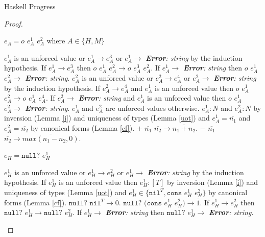 \begin{theorem}{Haskell Progress}
\begin{proof}
\begin{case}
\end{case}


\begin{case}

$e_{A}=o$ $e_{A}^{1}$ $e_{A}^{2}$ where $A\in\lbrace H,M\rbrace$

$e_{A}^{1}$ is an unforced value or $e_{A}^{1}\rightarrow e_{A}^{3}$ or $e_{A}^{1}\rightarrow$ \emph{\textbf{Error}: string} by the induction hypothesis.  If $e_{A}^{1}\rightarrow e_{A}^{3}$ then $o$ $e_{A}^{1}$ $e_{A}^{2}\rightarrow o$ $e_{A}^{3}$ $e_{A}^{2}$.  If $e_{A}^{1}\rightarrow$ \emph{\textbf{Error}: string} then $o$ $e_{A}^{1}$ $e_{A}^{2}\rightarrow$ \emph{\textbf{Error}: string}.  $e_{A}^{2}$ is an unforced value or $e_{A}^{2}\rightarrow e_{A}^{4}$ or $e_{A}^{2}\rightarrow$ \emph{\textbf{Error}: string} by the induction hypothesis.  If $e_{A}^{2}\rightarrow e_{A}^{4}$ and $e_{A}^{1}$ is an unforced value then $o$ $e_{A}^{1}$ $e_{A}^{2}\rightarrow o$ $e_{A}^{1}$ $e_{A}^{4}$.  If $e_{A}^{2}\rightarrow$ \emph{\textbf{Error}: string} and $e_{A}^{1}$ is an unforced value then $o$ $e_{A}^{1}$ $e_{A}^{2}\rightarrow$ \emph{\textbf{Error}: string}.  $e_{A}^{1}$ and $e_{A}^{2}$ are unforced values otherwise.  $e_{A}^{1}:N$ and $e_{A}^{2}:N$ by inversion (Lemma \ref{i}) and uniqueness of types (Lemma \ref{uot}) and $e_{A}^{1}=\overline{n_{1}}$ and $e_{A}^{2}=\overline{n_{2}}$ by canonical forms (Lemma \ref{cf}).  $+$ $\overline{n_{1}}$ $\overline{n_{2}}\rightarrow\overline{n_{1}+n_{2}}$.  $-$ $\overline{n_{1}}$ $\overline{n_{2}}\rightarrow\overline{max(n_{1}-n_{2},0)}$.

\end{case}


\begin{case}

$e_{H}=\mathtt{null?}$ $e_{H}^{1}$

$e_{H}^{1}$ is an unforced value or $e_{H}^{1}\rightarrow e_{H}^{2}$ or $e_{H}^{1}\rightarrow$ \emph{\textbf{Error}: string} by the induction hypothesis.  If $e_{H}^{1}$ is an unforced value then $e_{H}^{1}:[T]$ by inversion (Lemma \ref{i}) and uniqueness of types (Lemma \ref{uot}) and $e_{H}^{1}\in\lbrace\mathtt{nil}^{T},\mathtt{cons}$ $e_{H}^{1}$ $e_{H}^{2}\rbrace$ by canonical forms (Lemma \ref{cf}).  $\mathtt{null?}$ $\mathtt{nil}^{T}\rightarrow\overline{0}$.  $\mathtt{null?}$ $(\mathtt{cons}$ $e_{H}^{1}$ $e_{H}^{2})\rightarrow\overline{1}$.  If $e_{H}^{1}\rightarrow e_{H}^{2}$ then $\mathtt{null?}$ $e_{H}^{1}\rightarrow\mathtt{null?}$ $e_{H}^{2}$.  If $e_{H}^{1}\rightarrow$ \emph{\textbf{Error}: string} then $\mathtt{null?}$ $e_{H}^{1}\rightarrow$ \emph{\textbf{Error}: string}.


\end{case}
\end{proof}
\end{theorem}
